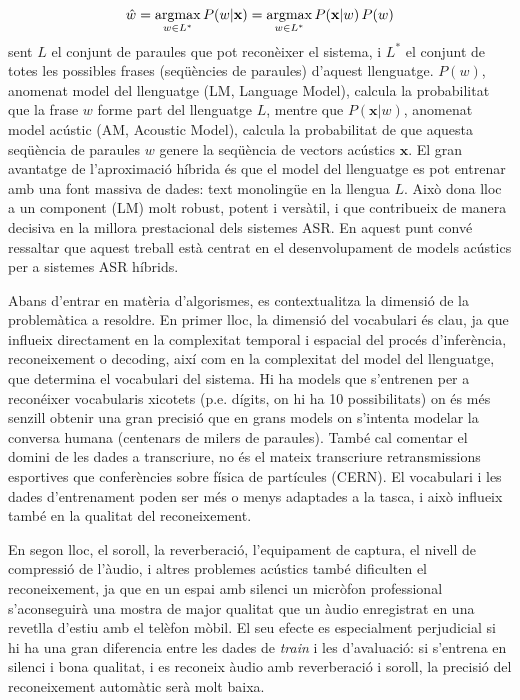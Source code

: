 \begin{equation}\label{eq:form_argmax_classif_ASR}
	\hat{w} = \operatorname*{argmax}_{w \in L^{*}} P(w | \textbf{x}) = \operatorname*{argmax}_{w \in L^{*}} P(\textbf{x} | w) \, P(w)
\end{equation}
sent $L$ el conjunt de paraules que pot reconèixer el sistema, i $L^{*}$ el conjunt de totes les possibles frases (seqüències de paraules) d'aquest llenguatge. $P(w)$, anomenat model del llenguatge (LM, Language Model), calcula la probabilitat que la frase $w$ forme part del llenguatge $L$, mentre que $P(\textbf{x} | w)$, anomenat model acústic (AM, Acoustic Model), calcula la probabilitat de que aquesta seqüència de paraules $w$ genere la seqüència de vectors acústics $\textbf{x}$.
El gran avantatge de l'aproximació híbrida és que el model del llenguatge es pot entrenar amb una font massiva de dades: text monolingüe en la llengua $L$. Això dona lloc a un component (LM) molt robust, potent i versàtil, i que contribueix de manera decisiva en la millora prestacional dels sistemes ASR. En aquest punt convé ressaltar que aquest treball està centrat en el desenvolupament de models acústics per a sistemes ASR híbrids.

Abans d'entrar en matèria d'algorismes, es contextualitza la dimensió de la problemàtica a resoldre. En primer lloc, la dimensió del vocabulari és clau, ja que influeix directament en la complexitat temporal i espacial del procés d'inferència, reconeixement o decoding, així com en la complexitat del model del llenguatge, que determina el vocabulari del sistema.
Hi ha models que s'entrenen per a reconéixer vocabularis xicotets (p.e. dígits, on hi ha 10 possibilitats) on és més senzill obtenir una gran precisió que en grans models on s'intenta modelar la conversa humana (centenars de milers de paraules).
També cal comentar el domini de les dades a transcriure, no és el mateix transcriure retransmissions esportives que conferències sobre física de partícules (CERN). El vocabulari i les dades d'entrenament poden ser més o menys adaptades a la tasca, i això influeix també en la qualitat del reconeixement.

En segon lloc, el soroll, la reverberació, l'equipament de captura, el nivell de compressió de l'àudio, i altres problemes acústics també dificulten el reconeixement, ja que en un espai amb silenci un micròfon professional s'aconseguirà una mostra de major qualitat que un àudio enregistrat en una revetlla d'estiu amb el telèfon mòbil.
El seu efecte es especialment perjudicial si hi ha una gran diferencia entre les dades de \textit{train} i les d'avaluació: si s'entrena en silenci i bona qualitat, i es reconeix àudio amb reverberació i soroll, la precisió del reconeixement automàtic serà molt baixa.

